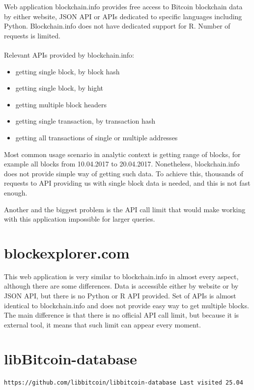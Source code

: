 \documentclass[12pt, en, eng, oneside]{mgr}
\begin{document}
Web application blockchain.info provides free access to Bitcoin blockchain data by either website, JSON API or APIs dedicated to specific languages including Python. Blockchain.info does not have dedicated support for R. Number of requests is limited.
\\
\\
Relevant APIs provided by blockchain.info:
\begin{itemize}
\item
getting single block, by block hash
\item
getting single block, by hight
\item
getting multiple block headers
\item
getting single transaction, by transaction hash
\item
getting all transactions of single or multiple addresses


\end{itemize}

Most common usage scenario in analytic context is getting range of blocks, for example all blocks from 10.04.2017 to 20.04.2017. Nonetheless, blockchain.info does not provide simple way of getting such data. To achieve this, thousands of requests to API providing us with single block data is needed, and this is not fast enough.

Another and the biggest problem is the API call limit that would make working with this application impossible for larger queries.

\section{blockexplorer.com}

This web application is very similar to blockchain.info in almost every aspect, although there are some differences. Data is accessible either by website or by JSON API, but there is no Python or R API provided. Set of APIs is almost identical to blockchain.info and does not provide easy way to get multiple blocks. The main difference is that there is no official API call limit, but because it is external tool, it means that such limit can appear every moment.

\section{libBitcoin-database}

\begin{verbatim}
https://github.com/libbitcoin/libbitcoin-database Last visited 25.04
\end{verbatim}
\end{document}
